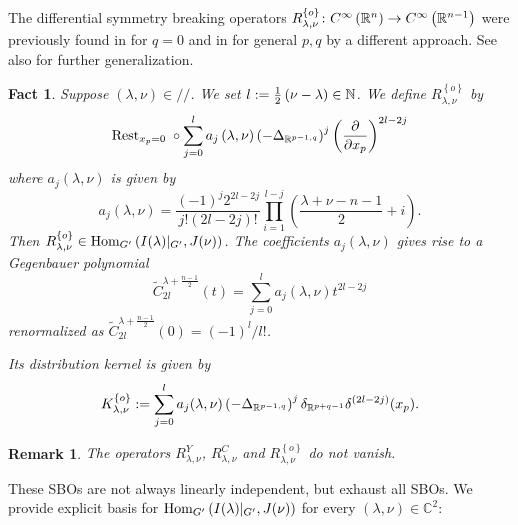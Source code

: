 \documentclass[reqno,12pt]{pja00} %
\newcommand{\Hom}{\mbox{\normalfont Hom}}
\newtheorem{remark}[theorem]{Remark}
\newtheorem{fact}[theorem]{Fact}
\theoremstyle{definition}
\theoremstyle{exampstyle} \newtheorem{examp}[theorem]{Theorem}
\newcommand{\IlambdaGprime}{I(\lambda)\kern-0.3em\mid_{G'}}
\newcommand{\SBO}{\Hom_{G'}\left(\IlambdaGprime,J(\nu) \right)}
\begin{document}
The differential symmetry breaking operators
 $R_{\lambda,\nu}^{\left\{ o \right\}}\colon
C^\infty\left( \mathbb{R}^n \right)\to C^\infty\left( \mathbb{R}^{n-1} \right)$
	were previously found in \cite[Thms.\ 5.1.1 and 5.2.1]{juhl2009families} for $q=0$ 
and in \cite[Thm.\ 4.3]{kobayashi2015branching}
	for general $p,q$ by a different approach. 
See also \cite{kokupe2016forms} for further generalization.
\begin{fact}\label{fact:singo}
	Suppose $(\lambda,\nu)\in//$. We set $l:=\frac{1}{2}\left( \nu-\lambda \right)\in\mathbb{N}$.
	We define $R_{\lambda,\nu}^{ \left\{ o \right\}}$ by
	\begin{equation*}
		\mbox{\normalfont Rest}_{x_p=0}\;\circ
	\sum_{j=0}^la_j\left( \lambda,\nu \right)\left(- \Delta_{\mathbb{R}^{p-1,q}} \right)^j\left( \frac{\partial}{\partial x_p} \right)^{2l-2j}
	\end{equation*}
	where $a_j(\lambda,\nu)$ is given by\begin{equation*}
		a_j(\lambda,\nu)=\frac{(-1)^j2^{2l-2j}}{j!(2l-2j)!}\prod_{i=1}^{l-j}\left(\frac{\lambda+\nu-n-1}{2} 
		+i \right).
	\end{equation*}
	Then $R_{\lambda,\nu}^{ \left\{ o \right\}}\in\Hom_{G'}\left( I(\lambda)\kern-0.1cm\mid_{G'},J(\nu) \right)$.
	The coefficients $a_j(\lambda,\nu)$ gives rise to a Gegenbauer polynomial\begin{equation*}
		\tilde{C}_{2l}^{\lambda+\frac{n-1}{2}}(t)=\sum_{j=0}^la_j(\lambda,\nu)t^{2l-2j}
	\end{equation*}
	renormalized as $\tilde{C}_{2l}^{\lambda+\frac{n-1}{2}}(0)=\left( -1 \right)^l/l!$.

	Its distribution kernel is given by
	\begin{equation*}
		K_{\lambda,\nu}^{ \left\{ o \right\} }:=\sum_{j=0}^la_j(\lambda,\nu)\left( -\Delta_{\R^{p-1,q}} \right)^j\delta_{\R^{p+q-1}}\delta^{\left( 2l-2j \right)}(x_p).
	\end{equation*}
\end{fact}
\begin{remark}\label{rmk:thm:construction}
	The operators $R_{\lambda,\nu}^Y$, $R_{\lambda,\nu}^C$ and $R^{ \left\{ o \right\}}_{\lambda,\nu}$ do not vanish.
\end{remark}
These SBOs are not always linearly independent, but exhaust all SBOs. We provide explicit
basis for $\SBO$ for every $(\lambda,\nu)\in \mathbb{C}^2$:
\end{document}
